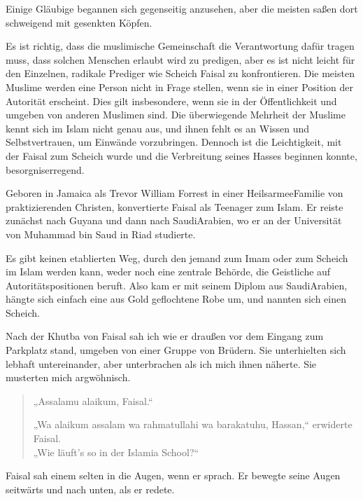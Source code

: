 \documentclass[12pt]{memoir}
\begin{document}
Einige Gläubige begannen sich gegenseitig anzusehen,
aber die meisten saßen dort schweigend mit gesenkten Köpfen.

Es ist richtig,
dass die muslimische Gemeinschaft die Verantwortung dafür tragen muss,
dass solchen Menschen erlaubt wird zu predigen,
aber es ist nicht leicht für den Einzelnen,
radikale Prediger wie Scheich Faisal zu konfrontieren.
Die meisten Muslime werden eine Person nicht in Frage stellen,
wenn sie in einer Position der Autorität erscheint.
Dies gilt insbesondere, wenn sie in der Öffentlichkeit und
umgeben von anderen Muslimen sind.
Die überwiegende Mehrheit der Muslime kennt sich im Islam nicht genau aus,
und ihnen fehlt es an Wissen und Selbstvertrauen, um Einwände vorzubringen.
Dennoch ist die Leichtigkeit, mit der Faisal zum Scheich wurde und
die Verbreitung seines Hasses beginnen konnte, besorgniserregend.

Geboren in Jamaica als Trevor William Forrest
in einer Heilsarmee\–Familie von praktizierenden Christen,
konvertierte Faisal als Teenager zum Islam.
Er reiste zunächst nach Guyana und dann nach Saudi\–Arabien,
wo er an der Universität von Muhammad bin Saud in Riad studierte.

Es gibt keinen etablierten Weg,
durch den jemand zum Imam oder zum Scheich im Islam werden kann,
weder noch eine zentrale Behörde,
die Geistliche auf Autoritätspositionen beruft.
Also kam er mit seinem Diplom aus Saudi\–Arabien,
hängte sich einfach eine aus Gold geflochtene Robe um,
und nannten sich einen Scheich.

Nach der Khutba von Faisal sah ich wie er draußen
vor dem Eingang zum Parkplatz stand,
umgeben von einer Gruppe von Brüdern.
Sie unterhielten sich lebhaft untereinander,
aber unterbrachen als ich mich ihnen näherte.
Sie musterten mich argwöhnisch.

\begin{quote}
„Assalamu alaikum, Faisal.“

„Wa alaikum assalam wa rahmatullahi wa barakatuhu, Hassan,“ erwiderte Faisal.\\
„Wie läuft’s so in der Islamia School?“
\end{quote}

Faisal sah einem selten in die Augen, wenn er sprach.
Er bewegte seine Augen seitwärts und nach unten, als er redete.
\end{document}
